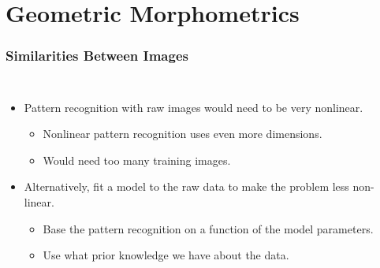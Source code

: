\documentclass{beamer}
\begin{document}
\section{Geometric Morphometrics}

\begin{frame}
\frametitle{Similarities Between Images}
\begin{columns}[c]
\begin{itemize}
\item{Pattern recognition with raw images would need to be very nonlinear.
\begin{itemize}
\item{Nonlinear pattern recognition uses even more dimensions.}
\item{Would need too many training images.}
\end{itemize}
}
\item{Alternatively, fit a model to the raw data to make the problem less non-linear.
\begin{itemize}
\item{Base the pattern recognition on a function of the model parameters.}
\item{Use what prior knowledge we have about the data.}
\end{itemize}
}
\end{itemize}

\end{columns}
\end{frame}
\end{document}
